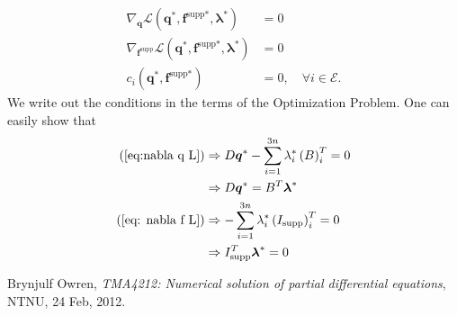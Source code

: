 \documentclass[10pt,a4paper]{article}
\begin{document}
\begin{align}
\nabla_{\boldsymbol{q}}\mathcal{L}\left(\boldsymbol{q}^*,\boldsymbol{f}^\text{supp*},\boldsymbol{\lambda}^*\right) &= 0 \label{eq:nabla q L} \\
\nabla_{\boldsymbol{f}^\text{supp}}\mathcal{L}\left(\boldsymbol{q}^*,\boldsymbol{f}^\text{supp*},\boldsymbol{\lambda}^*\right) &= 0 \label{eq: nabla f L} \\
c_i\left(\boldsymbol{q}^*,\boldsymbol{f}^\text{supp*}\right) &= 0, \quad \forall i \in \mathcal{E}. \label{eq: ci=0 all i in E}
\end{align}
We write out the conditions in the terms of the Optimization Problem. One can easily show that
\begin{align*}
\left(\ref{eq:nabla q L}\right) &\Rightarrow D\boldsymbol{q}^* - \sum_{i=1}^{3n}\lambda_i^*\left(B\right)_i^T = 0 \\
 &\Rightarrow D\boldsymbol{q}^* = B^T\boldsymbol{\lambda}^* \\
\left(\ref{eq: nabla f L}\right) &\Rightarrow -\sum_{i=1}^{3n}\lambda_i^*\left(I_\text{supp}\right)_i^T = 0 \\
 &\Rightarrow I_\text{supp}^T\boldsymbol{\lambda}^* = 0
\end{align*}




\begin{thebibliography}{2}
Brynjulf Owren, \emph{TMA4212: Numerical solution of partial differential equations}, NTNU, 24 Feb, 2012.
\end{thebibliography}
\end{document}
